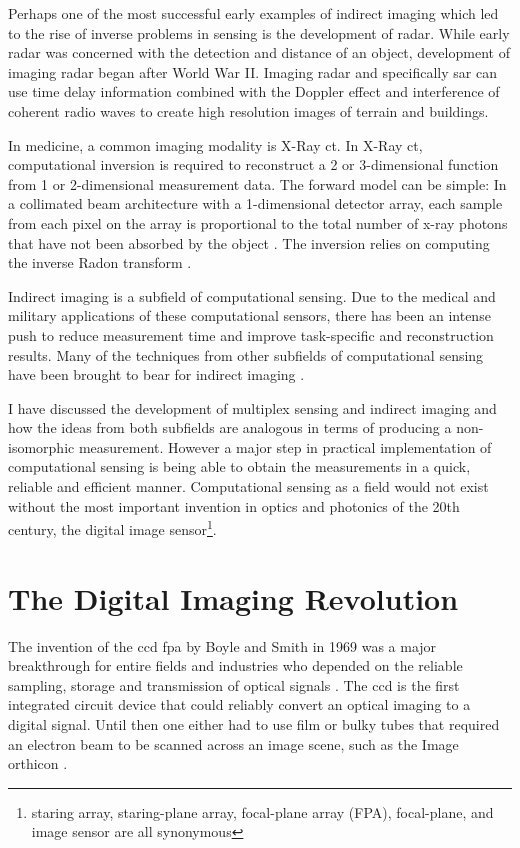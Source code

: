Perhaps one of the most successful early examples of indirect imaging which led to the rise of inverse problems in sensing is the development of radar. While early radar was concerned with the detection and distance of an object, development of imaging radar began after World War II. Imaging radar and specifically \gls{sar} can use time delay information combined with the Doppler effect and interference of coherent radio waves to create high resolution images of terrain and buildings. 

In medicine, a common imaging modality is X-Ray \gls{ct}. In X-Ray \gls{ct}, computational inversion is required to reconstruct a 2 or 3-dimensional function from 1 or 2-dimensional measurement data. The forward model can be simple: In a collimated beam architecture with a 1-dimensional detector array, each sample from each pixel on the array is proportional to the total number of x-ray photons that have not been absorbed by the object \cite{radon20051}. The inversion relies on computing the inverse Radon transform \cite{nobelprize1979medicine}. 

Indirect imaging is a subfield of computational sensing. Due to the medical and military applications of these computational sensors, there has been an intense push to reduce measurement time and improve task-specific and reconstruction results. Many of the techniques from other subfields of computational sensing have been brought to bear for indirect imaging \cite{zhu2010tomographic, chen2012compressive}. 

I have discussed the development of multiplex sensing and indirect imaging and how the ideas from both subfields are analogous in terms of producing a non-isomorphic measurement. However a major step in practical implementation of computational sensing is being able to obtain the measurements in a quick, reliable and efficient manner. Computational sensing as a field would not exist without the most important invention in optics and photonics of the 20th century, the digital image sensor\footnote{ staring array, staring-plane array, focal-plane array (FPA), focal-plane, and image sensor are all synonymous }.

\section{The Digital Imaging Revolution}

The invention of the \gls{ccd} \gls{fpa} by Boyle and Smith in 1969 was a major breakthrough for entire fields and industries who depended on the reliable sampling, storage and transmission of optical signals \cite{boyle1970charge}. The \gls{ccd} is the first integrated circuit device that could reliably convert an optical imaging  to a digital signal. Until then one either had to use film or bulky tubes that required an electron beam to be scanned across an image scene, such as the Image orthicon \cite{w1975image}. 

